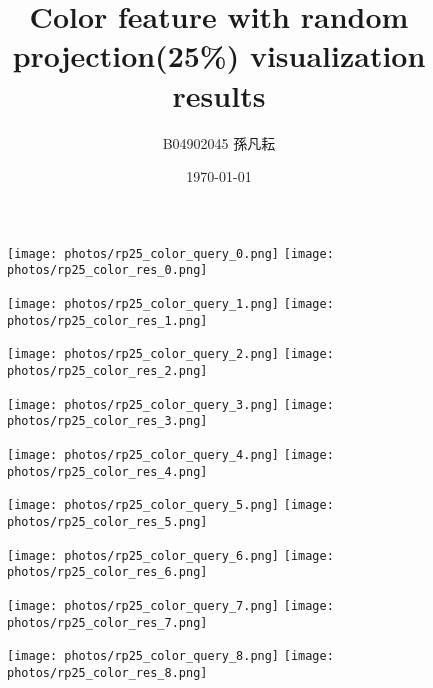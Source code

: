 \documentclass{article}
\begin{document}
\title{Color feature with random projection(25\%) visualization results}
\author{B04902045 孫凡耘}
\date{\today}
\maketitle

\begin{figure}[!ht]
\centering
\texttt{[image: photos/rp25\_color\_query\_0.png]}
\texttt{[image: photos/rp25\_color\_res\_0.png]}
\end{figure}

\begin{figure}[!ht]
\centering
\texttt{[image: photos/rp25\_color\_query\_1.png]}
\texttt{[image: photos/rp25\_color\_res\_1.png]}
\end{figure}

\begin{figure}[!ht]
\centering
\texttt{[image: photos/rp25\_color\_query\_2.png]}
\texttt{[image: photos/rp25\_color\_res\_2.png]}
\end{figure}

\begin{figure}[!ht]
\centering
\texttt{[image: photos/rp25\_color\_query\_3.png]}
\texttt{[image: photos/rp25\_color\_res\_3.png]}
\end{figure}

\begin{figure}[!ht]
\centering
\texttt{[image: photos/rp25\_color\_query\_4.png]}
\texttt{[image: photos/rp25\_color\_res\_4.png]}
\end{figure}

\begin{figure}[!ht]
\centering
\texttt{[image: photos/rp25\_color\_query\_5.png]}
\texttt{[image: photos/rp25\_color\_res\_5.png]}
\end{figure}

\begin{figure}[!ht]
\centering
\texttt{[image: photos/rp25\_color\_query\_6.png]}
\texttt{[image: photos/rp25\_color\_res\_6.png]}
\end{figure}

\begin{figure}[!ht]
\centering
\texttt{[image: photos/rp25\_color\_query\_7.png]}
\texttt{[image: photos/rp25\_color\_res\_7.png]}
\end{figure}

\begin{figure}[!ht]
\centering
\texttt{[image: photos/rp25\_color\_query\_8.png]}
\texttt{[image: photos/rp25\_color\_res\_8.png]}
\end{figure}
\end{document}

